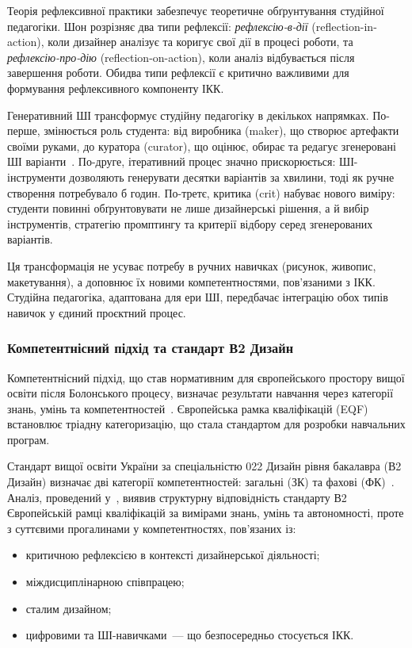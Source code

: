 Теорія рефлексивної практики \citet{Schon1983} забезпечує теоретичне обґрунтування студійної педагогіки. Шон розрізняє два типи рефлексії: \textit{рефлексію-в-дії} (reflection-in-action), коли дизайнер аналізує та коригує свої дії в процесі роботи, та \textit{рефлексію-про-дію} (reflection-on-action), коли аналіз відбувається після завершення роботи. Обидва типи рефлексії є критично важливими для формування рефлексивного компоненту ІКК.

Генеративний ШІ трансформує студійну педагогіку в декількох напрямках. По-перше, змінюється роль студента: від виробника (maker), що створює артефакти своїми руками, до куратора (curator), що оцінює, обирає та редагує згенеровані ШІ варіанти~\cite{Musiienko2026ScopingReview}. По-друге, ітеративний процес значно прискорюється: ШІ-інструменти дозволяють генерувати десятки варіантів за хвилини, тоді як ручне створення потребувало б годин. По-третє, критика (crit) набуває нового виміру: студенти повинні обґрунтовувати не лише дизайнерські рішення, а й вибір інструментів, стратегію промптингу та критерії відбору серед згенерованих варіантів.

Ця трансформація не усуває потребу в ручних навичках (рисунок, живопис, макетування), а доповнює їх новими компетентностями, пов'язаними з ІКК. Студійна педагогіка, адаптована для ери ШІ, передбачає інтеграцію обох типів навичок у єдиний проєктний процес.

\subsubsection{Компетентнісний підхід та стандарт В2 Дизайн}\label{sssec:1.4.3}

Компетентнісний підхід, що став нормативним для європейського простору вищої освіти після Болонського процесу, визначає результати навчання через категорії знань, умінь та компетентностей~\cite{EuropeanCommission2017}. Європейська рамка кваліфікацій (EQF) встановлює тріадну категоризацію, що стала стандартом для розробки навчальних програм.

Стандарт вищої освіти України за спеціальністю 022 Дизайн рівня бакалавра (В2 Дизайн) визначає дві категорії компетентностей: загальні (ЗК) та фахові (ФК)~\cite{MON2018}. Аналіз, проведений у~\cite{Musiienko2025DesignEducation}, виявив структурну відповідність стандарту В2 Європейській рамці кваліфікацій за вимірами знань, умінь та автономності, проте з суттєвими прогалинами у компетентностях, пов'язаних із:
\begin{itemize}
    \item критичною рефлексією в контексті дизайнерської діяльності;
    \item міждисциплінарною співпрацею;
    \item сталим дизайном;
    \item цифровими та ШІ-навичками~--- що безпосередньо стосується ІКК.
\end{itemize}


